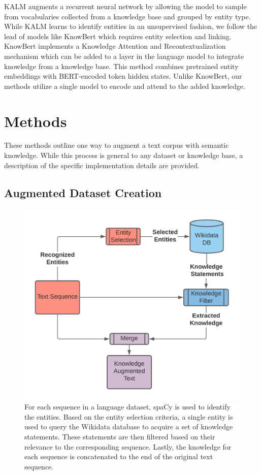 \documentclass[phd,electronic,oneside,twosidetoc,letterpaper,chaptercenter,parttop,lof]{byumsphd}
\begin{document}
KALM augments a recurrent neural network \cite{liu2019knowledge} by allowing the model to sample from vocabularies collected from a knowledge base and grouped by entity type.
While KALM learns to identify entities in an unsupervised fashion, we follow the lead of models like KnowBert \cite{peters2019knowledge} which requires entity selection and linking. 
KnowBert implements a Knowledge Attention and Recontextualization
mechanism which can be added to a layer in the language model to integrate knowledge from a knowledge base.
This method combines pretrained entity embeddings with BERT-encoded token hidden states.
Unlike KnowBert, our methods utilize a single model to encode and attend to the added knowledge.

\section{Methods}

These methods outline one way to augment a text corpus with semantic knowledge.
While this process is general to any dataset or knowledge base, a description of the specific implementation details are provided.
    
\subsection{Augmented Dataset Creation}
    
\begin{figure}
\includegraphics[width=0.5\columnwidth]{images/ssm/augmented_dataset_creation.png}
\centering
\caption[Augmented dataset creation]{
    For each sequence in a language dataset, spaCy is used to identify the entities.
    Based on the entity selection criteria, a single entity is used to query the Wikidata database to acquire a set of knowledge statements.
    These statements are then filtered based on their relevance to the corresponding sequence.
    Lastly, the knowledge for each sequence is concatenated to the end of the original text sequence. 
}
\label{fig:augmented_dataset_creation}
\end{figure}
\end{document}
